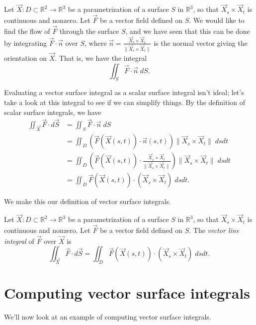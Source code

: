\documentclass{ximera}
\begin{document}
Let $\vec{X}:D\subset\mathbb{R}^2\rightarrow\mathbb{R}^3$ be a parametrization of a surface $S$ in $\mathbb{R}^3$, so that $\vec{X}_s\times\vec{X}_t$ is continuous and nonzero. Let $\vec{F}$ be a vector field defined on $S$. We would like to find the flow of $\vec{F}$ through the surface $S$, and we have seen that this can be done by integrating $\vec{F}\cdot \vec{n}$ over $S$, where $\vec{n} = \frac{\vec{X}_s\times\vec{X}_t}{\|\vec{X}_s\times\vec{X}_t\|}$ is the normal vector giving the orientation on $\vec{X}$. That is, we have the integral
\[
\iint_S\vec{F}\cdot \vec{n}\;dS.
\]

Evaluating a vector surface integral as a scalar surface integral isn't ideal; let's take a look at this integral to see if we can simplify things. By the definition of scalar surface integrals, we have
\begin{align*}
\iint_{\vec{X}}\vec{F}\cdot d\vec{S} &= \iint_S\vec{F}\cdot \vec{n}\;dS\\
&= \iint_D (\vec{F}(\vec{X}(s,t))\cdot\vec{n}(s,t))\|\vec{X}_s\times\vec{X}_t\|\;dsdt\\
&= \iint_D \left(\vec{F}(\vec{X}(s,t))\cdot\frac{\vec{X}_s\times\vec{X}_t}{\|\vec{X}_s\times\vec{X}_t\|}\right)\|\vec{X}_s\times\vec{X}_t\|\;dsdt\\
&= \iint_D \vec{F}(\vec{X}(s,t))\cdot (\vec{X}_s\times\vec{X}_t)\;dsdt.
\end{align*}

We make this our definition of vector surface integrals.

\begin{definition}
Let $\vec{X}:D\subset\mathbb{R}^2\rightarrow\mathbb{R}^3$ be a parametrization of a surface $S$ in $\mathbb{R}^3$, so that $\vec{X}_s\times\vec{X}_t$ is continuous and nonzero. Let $\vec{F}$ be a vector field defined on $S$. The \emph{vector line integral} of $\vec{F}$ over $\vec{X}$ is
\[
\iint_{\vec{X}}\vec{F}\cdot d\vec{S} = \iint_D \vec{F}(\vec{X}(s,t))\cdot (\vec{X}_s\times\vec{X}_t)\;dsdt.
\]
\end{definition}

\section*{Computing vector surface integrals}

We'll now look at an example of computing vector surface integrals.
\end{document}
